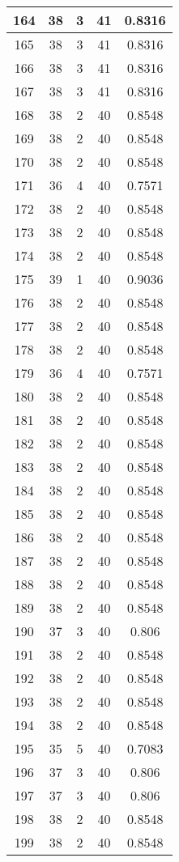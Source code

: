 \documentclass[letterpaper, 12pt]{article}
\begin{document}
\begin{longtable}{|c|c|c|c|c|}
\hline
164 & 38 & 3 & 41 & 0.8316 \\
\hline
165 & 38 & 3 & 41 & 0.8316 \\
\hline
166 & 38 & 3 & 41 & 0.8316 \\
\hline
167 & 38 & 3 & 41 & 0.8316 \\
\hline
168 & 38 & 2 & 40 & 0.8548 \\
\hline
169 & 38 & 2 & 40 & 0.8548 \\
\hline
170 & 38 & 2 & 40 & 0.8548 \\
\hline
171 & 36 & 4 & 40 & 0.7571 \\
\hline
172 & 38 & 2 & 40 & 0.8548 \\
\hline
173 & 38 & 2 & 40 & 0.8548 \\
\hline
174 & 38 & 2 & 40 & 0.8548 \\
\hline
175 & 39 & 1 & 40 & 0.9036 \\
\hline
176 & 38 & 2 & 40 & 0.8548 \\
\hline
177 & 38 & 2 & 40 & 0.8548 \\
\hline
178 & 38 & 2 & 40 & 0.8548 \\
\hline
179 & 36 & 4 & 40 & 0.7571 \\
\hline
180 & 38 & 2 & 40 & 0.8548 \\
\hline
181 & 38 & 2 & 40 & 0.8548 \\
\hline
182 & 38 & 2 & 40 & 0.8548 \\
\hline
183 & 38 & 2 & 40 & 0.8548 \\
\hline
184 & 38 & 2 & 40 & 0.8548 \\
\hline
185 & 38 & 2 & 40 & 0.8548 \\
\hline
186 & 38 & 2 & 40 & 0.8548 \\
\hline
187 & 38 & 2 & 40 & 0.8548 \\
\hline
188 & 38 & 2 & 40 & 0.8548 \\
\hline
189 & 38 & 2 & 40 & 0.8548 \\
\hline
190 & 37 & 3 & 40 & 0.806 \\
\hline
191 & 38 & 2 & 40 & 0.8548 \\
\hline
192 & 38 & 2 & 40 & 0.8548 \\
\hline
193 & 38 & 2 & 40 & 0.8548 \\
\hline
194 & 38 & 2 & 40 & 0.8548 \\
\hline
195 & 35 & 5 & 40 & 0.7083 \\
\hline
196 & 37 & 3 & 40 & 0.806 \\
\hline
197 & 37 & 3 & 40 & 0.806 \\
\hline
198 & 38 & 2 & 40 & 0.8548 \\
\hline
199 & 38 & 2 & 40 & 0.8548 \\
\hline
\end{longtable}
\end{document}

